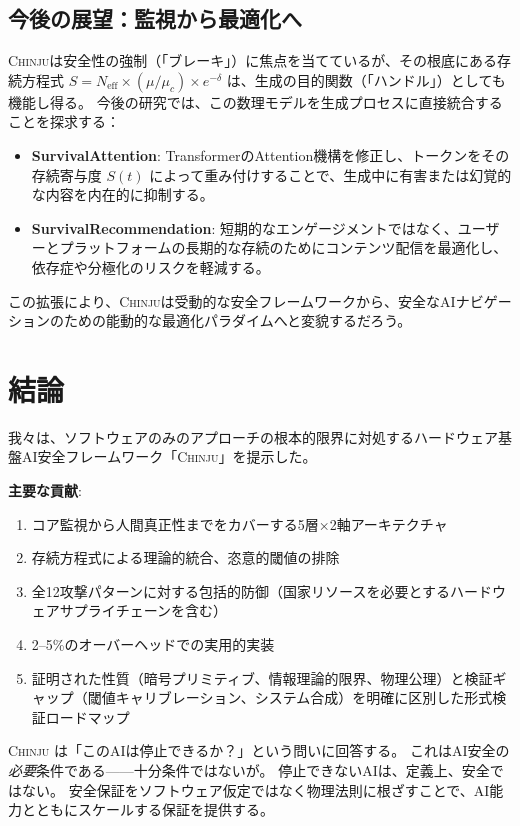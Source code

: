 \documentclass[11pt,a4paper]{article}
\newcommand{\chinju}{\textsc{Chinju}}
\newcommand{\Neff}{N_{\text{eff}}}
\newcommand{\muc}{\mu_c}
\begin{document}
\subsection{今後の展望：監視から最適化へ}
\chinju{}は安全性の強制（「ブレーキ」）に焦点を当てているが、その根底にある存続方程式 $S = \Neff \times (\mu/\muc) \times e^{-\delta}$ は、生成の目的関数（「ハンドル」）としても機能し得る。
今後の研究では、この数理モデルを生成プロセスに直接統合することを探求する：
\begin{itemize}
    \item \textbf{SurvivalAttention}: TransformerのAttention機構を修正し、トークンをその存続寄与度 $S(t)$ によって重み付けすることで、生成中に有害または幻覚的な内容を内在的に抑制する。
    \item \textbf{SurvivalRecommendation}: 短期的なエンゲージメントではなく、ユーザーとプラットフォームの長期的な存続のためにコンテンツ配信を最適化し、依存症や分極化のリスクを軽減する。
\end{itemize}
この拡張により、\chinju{}は受動的な安全フレームワークから、安全なAIナビゲーションのための能動的な最適化パラダイムへと変貌するだろう。

\section{結論}
\label{sec:conclusion}

我々は、ソフトウェアのみのアプローチの根本的限界に対処するハードウェア基盤AI安全フレームワーク「\chinju{}」を提示した。

\textbf{主要な貢献}:
\begin{enumerate}
    \item コア監視から人間真正性までをカバーする5層×2軸アーキテクチャ
    \item 存続方程式による理論的統合、恣意的閾値の排除
    \item 全12攻撃パターンに対する包括的防御（国家リソースを必要とするハードウェアサプライチェーンを含む）
    \item 2--5\%のオーバーヘッドでの実用的実装
    \item 証明された性質（暗号プリミティブ、情報理論的限界、物理公理）と検証ギャップ（閾値キャリブレーション、システム合成）を明確に区別した形式検証ロードマップ
\end{enumerate}

\chinju{} は「このAIは停止できるか？」という問いに回答する。
これはAI安全の\emph{必要}条件である——十分条件ではないが。
停止できないAIは、定義上、安全ではない。
安全保証をソフトウェア仮定ではなく物理法則に根ざすことで、AI能力とともにスケールする保証を提供する。
\end{document}
